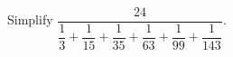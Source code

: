 Simplify $\dfrac{24}{\dfrac{1}{3}+\dfrac{1}{15}+\dfrac{1}{35}+\dfrac{1}{63}+\dfrac{1}{99}+\dfrac{1}{143}}$.
